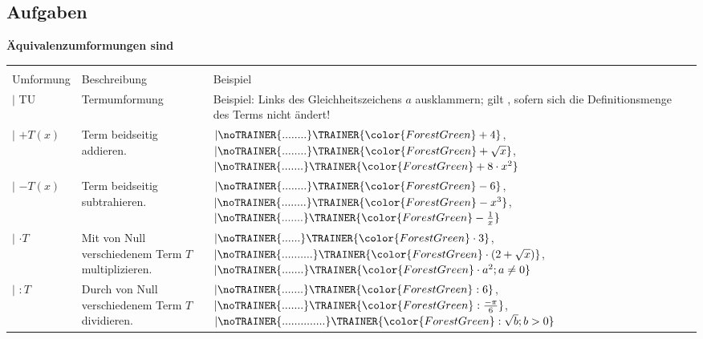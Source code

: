 \subsection*{Aufgaben}





\newpage


\textbf{{\color{ForestGreen}Äquivalenzumformungen sind}}

\begin{tabular}{lp{6cm}p{8cm}}\hline\\%
Umformung   & Beschreibung  & Beispiel \\\hline
$| $ TU      & Termumformung & {\raggedright Beispiel: Links des Gleichheitszeichens $a$ ausklammern; gilt , sofern sich die Definitionsmenge des Terms nicht ändert!}\\
$| $ $+ T(x)$  & Term beidseitig addieren. & $| \noTRAINER{........}\TRAINER{\color{ForestGreen}+4}$, $| \noTRAINER{........}\TRAINER{\color{ForestGreen}+\sqrt{x}}$, $| \noTRAINER{.......}\TRAINER{\color{ForestGreen}+8\cdot{}x^2}$\\
$| $ $- T(x)$  & Term beidseitig subtrahieren. & $| \noTRAINER{........}\TRAINER{\color{ForestGreen}-6}$, $|\noTRAINER{........}\TRAINER{\color{ForestGreen}-x^3}$, $|\noTRAINER{.......}\TRAINER{\color{ForestGreen} -\frac1{x}}$\\
$| $ $\cdot{} T$  & Mit von Null verschiedenem Term $T$ multiplizieren. & $| \noTRAINER{......}\TRAINER{\color{ForestGreen}\cdot{} 3}$, $|\noTRAINER{..........}\TRAINER{\color{ForestGreen}\cdot{}(2+\sqrt{x})}$, $|\noTRAINER{.......}\TRAINER{\color{ForestGreen}\cdot{}a^2; a\ne 0}$\\
$| $ $: T$  & Durch von Null verschiedenem Term $T$ dividieren. & $| \noTRAINER{.......}\TRAINER{\color{ForestGreen}: 6}$, $|\noTRAINER{.......}\TRAINER{\color{ForestGreen}: \frac{-\pi}6}$, $|\noTRAINER{..............}\TRAINER{\color{ForestGreen}:\sqrt{b}; b> 0}$\\
\end{tabular}

